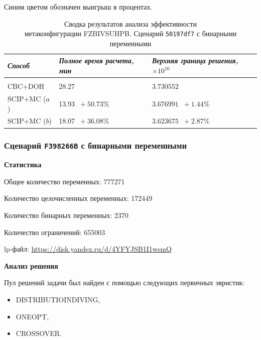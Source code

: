 \documentclass[%
	11pt,
	a4paper,
	utf8,
		]{article}
\begin{document}
Синим цветом обозначен выигрыш в процентах.

{
	\begin{table}[!h]
		\centering
		\caption{Сводка результатов анализа эффективности\\метаконфигурации FZBIVSUHPB. Сценарий \texttt{50197df7} с бинарными переменными}
		\begin{tabular}{ p{2.5cm} p{3.3cm} p{3.4cm} }
			\emph{Способ} & \emph{Полное время расчета, мин} & \emph{Верхняя граница решения, $ \times 10^{10} $} \\
			\hline\hline\\[-3.5mm]
			{CBC+DOH} & 28.27 & $ 3.730552 $ \\
			\hline
			SCIP+MC ($ a $) & 13.93 {\color{blue} $\ +50.73 $\%} & $ 3.676991 $ {\color{blue} $\ +1.44 $\%} \\
			\hline
			SCIP+MC ($ b $) & 18.07 {\color{blue} $\ +36.08 $\%} & $ 3.623675 $ {\color{blue} $\ +2.87 $\%} \\
		\end{tabular}\label{tab:50197df7}
	\end{table}
}

\subsubsection{Сценарий \texttt{F398266B} с бинарными переменными}

\textbf{Статистика}\vspace*{1mm}

Общее количество переменных: 777271

Количество целочисленных переменных: 172449

Количество бинарных переменных: 2370

Количество ограничений: 655003

lp-файл: \url{https://disk.yandex.ru/d/4YFYJSB1I1wsmQ} 

\vspace*{5mm}\textbf{Анализ решения}\vspace*{1mm}

Пул решений задачи был найден с помощью следующих первичных эвристик:
\begin{itemize}
	\item DISTRIBUTIOINDIVING,
	
	\item ONEOPT,
	
	\item CROSSOVER.
\end{itemize}
\end{document}
